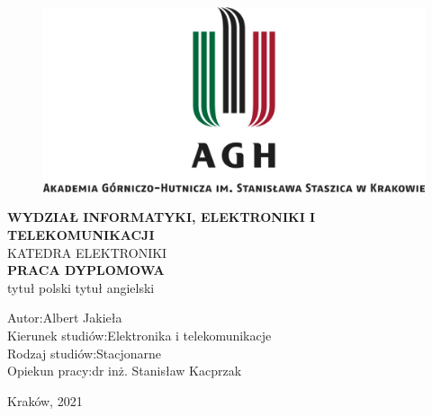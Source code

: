 \begin{titlepage}
            
    \begin{center}
            \vspace{24.5pt}
            
            \begin{figure}[h!]
                \center
                \includegraphics[width=14cm]{./title_page/loga/agh_logo.png}
            \end{figure}
            
            \vspace{13.5pt}
            \textbf{WYDZIAŁ INFORMATYKI, ELEKTRONIKI I TELEKOMUNIKACJI}\\
            \small{KATEDRA ELEKTRONIKI}\\
            \vspace{54pt}
            \large{\textbf{PRACA DYPLOMOWA}}\\
            \vspace{13.5pt}
            \large{tytuł polski}
            \linebreak
            tytuł angielski
            \vspace{5cm}
            
        \begin{flushleft}
            Autor:\hspace{3.4cm}Albert Jakieła\\
            Kierunek studiów:\hspace{1cm}Elektronika i telekomunikacje\\
            Rodzaj studiów:\hspace{1.5cm}Stacjonarne\\
            Opiekun pracy:\hspace{1.6cm}dr inż. Stanisław Kacprzak\\
        \end{flushleft}
        
        \vspace{0.5cm}
        Kraków, 2021
        
    \end{center}

\end{titlepage}
